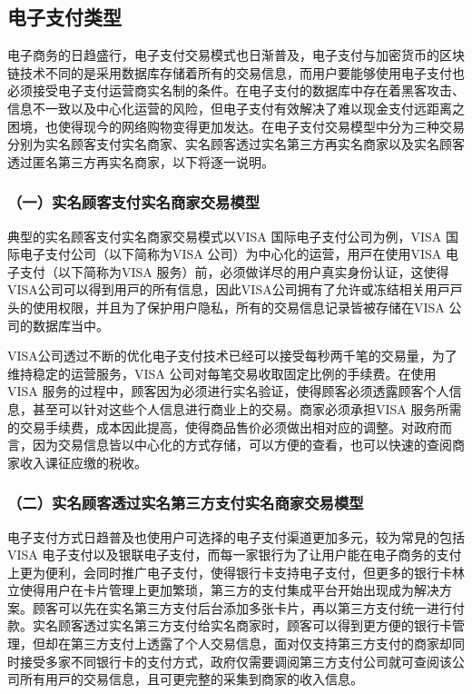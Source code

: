 	\subsection{电子支付类型}
	电子商务的日趋盛⾏，电⼦支付交易模式也日渐普及，电子支付与加密货币的区块链技术不同的是采用数据库存储着所有的交易信息，而用户要能够使用电子支付也必须接受电子支付运营商实名制的条件。在电子支付的数据库中存在着黑客攻击、信息不一致以及中心化运营的风险，但电⼦⽀付有效解决了难以现金支付远距离之困境，也使得现今的网络购物变得更加发达。在电子支付交易模型中分为三种交易分别为实名顾客支付实名商家、实名顾客透过实名第三方再实名商家以及实名顾客透过匿名第三方再实名商家，以下将逐一说明。

		\subsubsection{（一）实名顾客支付实名商家交易模型}
		典型的实名顾客支付实名商家交易模式以VISA 国际电⼦⽀付公司为例，VISA 国际电⼦⽀付公司（以下简称为VISA 公司）为中⼼化的运营，⽤⼾在使用VISA 电⼦⽀付（以下简称为VISA 服务）前，必须做详尽的⽤户真实⾝份认证，这使得VISA公司可以得到⽤⼾的所有信息，因此VISA公司拥有了允许或冻结相关⽤⼾⼾头的使用权限，并且为了保护用户隐私，所有的交易信息记录皆被存储在VISA 公司的数据库当中。

		VISA公司透过不断的优化电⼦⽀付技术已经可以接受每秒两千笔的交易量，为了维持稳定的运营服务，VISA 公司对每笔交易收取固定⽐例的⼿续费。在使用VISA 服务的过程中，顾客因为必须进⾏实名验证，使得顾客必须透露顾客个⼈信息，甚⾄可以针对这些个⼈信息进⾏商业上的交易。商家必须承担VISA 服务所需的交易⼿续费，成本因此提高，使得商品售价必须做出相对应的调整。对政府⽽⾔，因为交易信息皆以中⼼化的⽅式存储，可以⽅便的查看，也可以快速的查阅商家收⼊课征应缴的税收。
		

		\subsubsection{（二）实名顾客透过实名第三方支付实名商家交易模型}
		电⼦⽀付⽅式⽇趋普及也使用户可选择的电⼦⽀付渠道更加多元，较为常⾒的包括VISA 电⼦⽀付以及银联电⼦⽀付，⽽每⼀家银⾏为了让用户能在电⼦商务的⽀付上更为便利，会同时推广电⼦⽀付，使得银⾏卡⽀持电⼦⽀付，但更多的银⾏卡林⽴使得用户在卡⽚管理上更加繁琐，第三⽅的支付集成平台开始出现成为解决⽅案。顾客可以先在实名第三⽅⽀付后台添加多张卡⽚，再以第三⽅⽀付统一进⾏付款。实名顾客透过实名第三⽅⽀付给实名商家时，顾客可以得到更⽅便的银⾏卡管理，但却在第三⽅⽀付上透露了个⼈交易信息，面对仅⽀持第三⽅⽀付的商家却同时接受多家不同银⾏卡的⽀付⽅式，政府仅需要调阅第三⽅⽀付公司就可查阅该公司所有⽤⼾的交易信息，且可更完整的采集到商家的收⼊信息。
		
